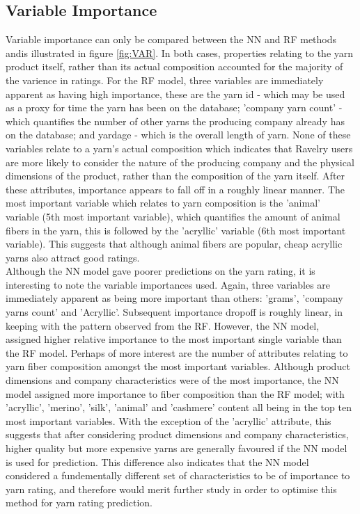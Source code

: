\documentclass[journal]{IEEEtran}
\begin{document}
\subsection{Variable Importance}
 Variable importance can only be compared between the NN and RF methods andis illustrated in figure \ref{fig:VAR}. In both cases, properties relating to the yarn product itself, rather than its actual composition accounted for the majority of the varience in ratings. For the RF model, three variables are immediately apparent as having high importance, these are the yarn id - which may be used as a proxy for time the yarn has been on the database; 'company yarn count' - which quantifies the number of other yarns the producing company already has on the database; and yardage - which is the overall length of yarn. None of these variables relate to a yarn's actual composition which indicates that Ravelry users are more likely to consider the nature of the producing company and the physical dimensions of the product, rather than the composition of the yarn itself. After these attributes, importance appears to fall off in a roughly linear manner. The most important variable which relates to yarn composition is the 'animal' variable (5th most important variable), which quantifies the amount of animal fibers in the yarn, this is followed by the 'acryllic' variable (6th most important variable). This suggests that although animal fibers are popular, cheap acryllic yarns also attract good ratings.  \\

Although the NN model gave poorer predictions on the yarn rating, it is interesting to note the variable importances used. Again, three variables are immediately apparent as being more important than others: 'grams', 'company yarns count' and 'Acryllic'. Subsequent importance dropoff is roughly linear, in keeping with the pattern observed from the RF. However, the NN model, assigned higher relative importance to the most important single variable than the RF model. Perhaps of more interest are the number of attributes relating to yarn fiber composition amongst the most important variables. Although product dimensions and company characteristics were of the most importance, the NN model assigned more importance to fiber composition than the RF model; with 'acryllic', 'merino', 'silk', 'animal' and 'cashmere' content all being in the top ten most important variables. With the exception of the 'acryllic' attribute, this suggests that after considering product dimensions and company characteristics, higher quality but more expensive yarns are generally favoured if the NN model is used for prediction. This difference also indicates that the NN model considered a fundementally different set of characteristics to be of importance to yarn rating, and therefore would merit further study in order to optimise this method for yarn rating prediction.
\end{document}

